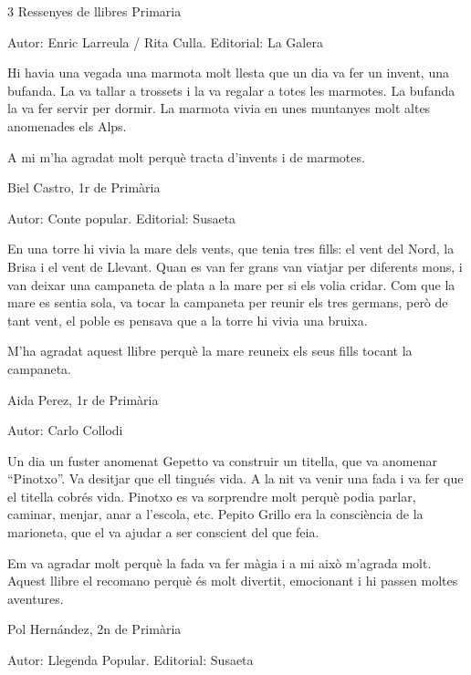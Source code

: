 %
%
\begin{shortnews}
{3} %
{Ressenyes de llibres}
{}
{Primaria}

{
Autor: Enric Larreula / Rita Culla.   Editorial: La Galera 

Hi havia una vegada una marmota molt llesta que un dia va fer un invent, una bufanda. La va tallar a trossets i la va regalar a totes les marmotes. La bufanda la va fer servir per dormir. La marmota vivia en unes muntanyes molt altes anomenades els Alps.

A mi m’ha agradat molt perquè tracta d’invents i de marmotes.
									
Biel Castro, 1r de Primària
}

{
Autor: Conte popular.   Editorial: Susaeta

En una torre hi vivia la mare dels vents, que tenia tres fills: el vent del Nord, la Brisa i el vent de Llevant. Quan es van fer grans van viatjar per diferents mons, i van deixar una campaneta de plata a la mare per si els volia cridar.  Com que la mare es sentia sola, va tocar la campaneta per reunir els tres germans, però de tant vent, el poble es pensava que a la torre hi vivia una bruixa.

M’ha agradat aquest llibre perquè la mare reuneix els seus fills tocant la campaneta.
									
Aida Perez, 1r de Primària
}

{
Autor: Carlo Collodi      

Un dia un fuster anomenat Gepetto va construir un titella, que va anomenar  “Pinotxo”. Va desitjar que  ell tingués vida. A la nit va venir una fada i va fer que el titella cobrés vida. Pinotxo es va sorprendre molt perquè podia parlar, caminar, menjar, anar a l’escola, etc. Pepito Grillo era la consciència de la marioneta, que el va ajudar a ser conscient del que feia. 

Em va agradar molt perquè la fada va fer màgia i a mi això m’agrada molt. Aquest llibre el recomano perquè és molt divertit, emocionant i hi passen moltes aventures.

Pol Hernández,  2n de Primària
}

{
Autor: Llegenda Popular.    Editorial: Susaeta  

}
\end{shortnews}
